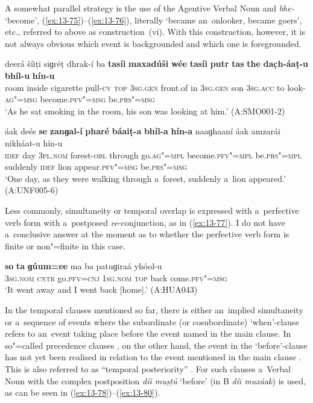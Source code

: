 A somewhat parallel strategy is the use of the Agentive Verbal Noun and \textit{bhe-} `become', (\ref{ex:13-75})--(\ref{ex:13-76}), literally `became an~onlooker, became goers', etc., referred to above as construction~(vi). With this construction, however, it is not always obvious which event is backgrounded and which one is foregrounded. 

\begin{exe}
\ex
\label{ex:13-75}
\gll deerá šíiṭi siɡréṭ dhrak-í ba \textbf{tasíi} \textbf{maxadúši} \textbf{wée} \textbf{tasíi} \textbf{putr} \textbf{tas} \textbf{the} \textbf{dac̣h-áaṭ-u} \textbf{bhíl-u} \textbf{hín-u} \\
room inside cigarette pull-\textsc{cv} \textsc{top} \textsc{3sg.gen} front.of in \textsc{3sg.gen}  son \textsc{3sg.acc} to look-\textsc{ag"=msg} become.\textsc{pfv"=msg} be.\textsc{prs"=msg}  \\
\glt `As he sat smoking in the room, his son was looking at him.' (A:SMO001-2)

\ex
\label{ex:13-76}
\gll áak deés \textbf{se} \textbf{zanɡal-í} \textbf{pharé} \textbf{báaiṭ-a} \textbf{bhíl-a} \textbf{hín-a} naaɡhaaní áak amzarái nikháat-u hín-u \\
\textsc{idef} day \textsc{3pl.nom} forest-\textsc{obl} through go.\textsc{ag"=mpl}  become.\textsc{pfv"=mpl} be.\textsc{prs"=mpl} suddenly \textsc{idef} lion appear.\textsc{pfv"=msg} be.\textsc{prs"=msg}  \\
\glt `One day, as they were walking through a~forest, suddenly a~lion appeared.' (A:UNF005-6) 
\end{exe}

Less commonly, simultaneity or temporal overlap is expressed with a~perfective verb form with a~postposed \textit{ee}-conjunction, as in (\ref{ex:13-77}). I do not have a~conclusive answer at the moment as to whether the perfective verb form is finite or non"=finite in this case.

\begin{exe}
\ex
\label{ex:13-77}
\gll \textbf{so} \textbf{ta} \textbf{ɡúum=ee} ma ba patuɡiraá yhóol-u \\
\textsc{3sg.nom} \textsc{cntr} go.\textsc{pfv=cnj} \textsc{1sg.nom} \textsc{top} back  come.\textsc{pfv"=msg} \\
\glt `It went away and I went back [home].' (A:HUA043) 
\end{exe}

 In the temporal clauses mentioned so far, there is either an~implied simultaneity or a~sequence of events where the subordinate (or cosubordinate) `when'-clause refers to an~event taking place before the event named in the main clause. In so"=called precedence clauses \citep[327]{givon2001b}, on the other hand, the event in the `before'-clause has not yet been realised in relation to the event mentioned in the main clause \citep[247--248]{thompsonetal2007}. This is also referred to as ``temporal posteriority'' \citep[159]{cristofaro2005}. For such clauses a~Verbal Noun with the complex postposition \textit{díi muṣṭú} `before' (in B \textit{díi muxáak}) is used, as can be seen in (\ref{ex:13-78})--(\ref{ex:13-80}).

